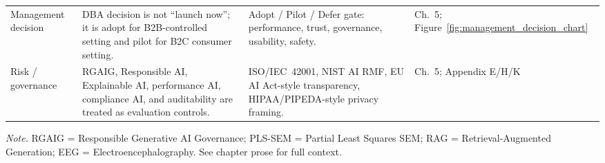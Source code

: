 {\begin{xltabular}{\textwidth}{@{} >{\raggedright\arraybackslash}p{2.1cm} p{5.2cm} p{4.7cm} >{\raggedright\arraybackslash}p{2.2cm} @{}}
\addlinespace
Management decision & DBA decision is not ``launch now''; it is adopt for B2B-controlled setting and pilot for B2C consumer setting. & Adopt / Pilot / Defer gate: performance, trust, governance, usability, safety. & Ch.~5; Figure~\ref{fig:management_decision_chart} \\
\addlinespace
Risk / governance & RGAIG, Responsible AI, Explainable AI, performance AI, compliance AI, and auditability are treated as evaluation controls. & ISO/IEC~42001, NIST AI RMF, EU AI Act-style transparency, HIPAA/PIPEDA-style privacy framing. & Ch.~5; Appendix E/H/K \\
\end{xltabular}}
\vspace{0.3em}\noindent\textit{Note.} RGAIG = Responsible Generative AI Governance; PLS-SEM = Partial Least Squares SEM; RAG = Retrieval-Augmented Generation; EEG = Electroencephalography. See chapter prose for full context.

